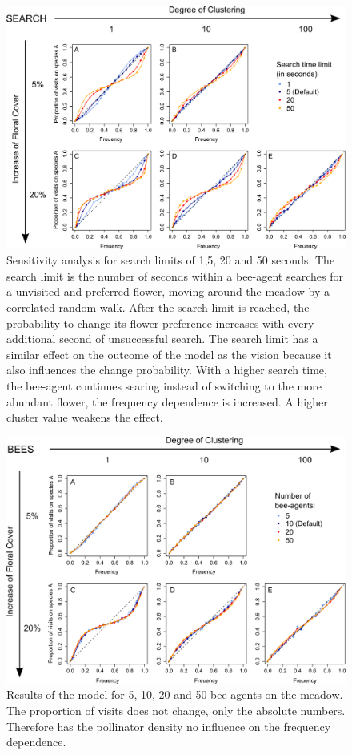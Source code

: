 \clearpage


\begin{figure} [!h] 
	\centering
	\includegraphics[width=14cm]{Images/SA_flight}
	\caption{Sensitivity analysis for search limits of 1,5, 20 and 50 seconds. The search limit is the number of seconds within a bee-agent searches for a unvisited and preferred flower, moving around the meadow by a correlated random walk. After the search limit is reached, the probability to change its flower preference increases with every additional second of unsuccessful search. The search limit has a similar effect on the outcome of the model as the vision because it also influences the change probability. With a higher search time, the bee-agent continues searing instead of switching to the more abundant flower, the frequency dependence is increased. A higher cluster value weakens the effect.}
	\label{fig:SA_flight}
\end{figure}

\clearpage

\begin{figure} [!h]
	\centering
	\includegraphics[width=14cm]{Images/SA_bees}
	\caption{Results of the model for 5, 10, 20 and 50 bee-agents on the meadow. The proportion of visits does not change, only the absolute numbers. Therefore has the pollinator density no influence on the frequency dependence.}
	\label{fig:SA_bees}
\end{figure}


